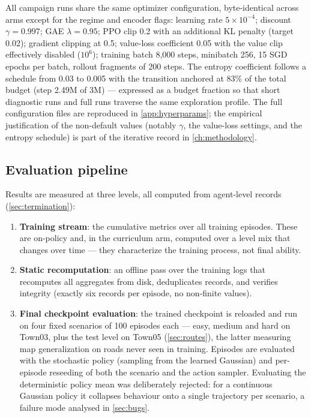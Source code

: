 All campaign runs share the same optimizer configuration, byte-identical
across arms except for the regime and encoder flags: learning rate
$5\times10^{-4}$; discount $\gamma = 0.997$; GAE $\lambda = 0.95$; PPO
clip 0.2 with an additional KL penalty (target 0.02); gradient clipping at
0.5; value-loss coefficient 0.05 with the value clip effectively disabled
($10^6$); training batch 8{,}000 steps, minibatch 256, 15 SGD epochs per
batch, rollout fragments of 200 steps. The entropy coefficient follows a
schedule from 0.03 to 0.005 with the transition anchored at 83\% of the
total budget (step 2.49M of 3M) --- expressed as a budget fraction so that
short diagnostic runs and full runs traverse the same exploration profile.
The full configuration files are reproduced in \cref{app:hyperparams};
the empirical justification of the non-default values (notably $\gamma$,
the value-loss settings, and the entropy schedule) is part of the
iterative record in \cref{ch:methodology}.

\subsection{Evaluation pipeline}
\label{sec:eval-pipeline}

Results are measured at three levels, all computed from agent-level
records (\cref{sec:termination}):

\begin{enumerate}
  \item \textbf{Training stream}: the cumulative metrics over all training
        episodes. These are on-policy and, in the curriculum arm, computed
        over a level mix that changes over time --- they characterize the
        training process, not final ability.
  \item \textbf{Static recomputation}: an offline pass over the training
        logs that recomputes all aggregates from disk, deduplicates
        records, and verifies integrity (exactly six records per episode,
        no non-finite values).
  \item \textbf{Final checkpoint evaluation}: the trained checkpoint is
        reloaded and run on four fixed scenarios of 100 episodes each ---
        easy, medium and hard on Town03, plus the test level on Town05
        (\cref{sec:routes}), the latter measuring map generalization on
        roads never seen in training. Episodes are evaluated with the
        stochastic policy (sampling from the learned Gaussian) and
        per-episode reseeding of both the scenario and the action sampler.
        Evaluating the deterministic policy mean was deliberately
        rejected: for a continuous Gaussian policy it collapses behaviour
        onto a single trajectory per scenario, a failure mode analysed in
        \cref{sec:bugs}.
\end{enumerate}
